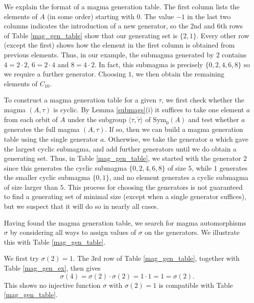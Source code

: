 \documentclass[letterpaper,12pt]{amsart}
\numberwithin{equation}{section}
\numberwithin{algorithm}{section}
\theoremstyle{definition}
\newcommand{\Symo}{\mathrm{Sym}_0}
\newcommand{\ttau}{\tilde{\tau}}
\begin{document}
We explain the format of a magma generation table. The first column lists the elements of $A$ (in some order) starting with $0$. The value $-1$ in the last two columns indicates the introduction of a new generator, so the 2nd and 6th rows of Table \ref{mag_gen_table} show that our generating set is $\{2,1\}$. Every other row (except the first) shows how the element in the first column is obtained from previous elements. Thus, in our example, the submagma generated by $2$ contains $4=2 \cdot 2$, $6=2 \cdot 4$ and $8=4 \cdot 2$. In fact, this submagma is precisely $\{0,2,4,6,8\}$ so we require a further generator. Choosing $1$, we then obtain the remaining elements of $C_{10}$. 

To construct a magma generation table for a given $\tau$, we first check whether the magma $(A,\tau)$ is cyclic. By Lemma \ref{submags}(i) it suffices to take one element $a$ from each orbit of $A$ under the subgroup $\langle \tau, \ttau \rangle$ of $\Symo(A)$ and test whether $a$ generates the full magma $(A,\tau)$. If so, then we can build a magma generation table using the single generator $a$. Otherwise, we take the generator $a$ which gave the largest cyclic submagma, and add further generators until we do obtain a generating set. Thus, in Table \ref{mag_gen_table}, we started with the generator $2$ since this generates the cyclic submagma $\{0,2,4,6,8\}$ of size $5$, while $1$ generates the smaller cyclic submagma $\{0,1\}$, and no element generates a cyclic submagma of size larger than $5$. This process for choosing the generators is not guaranteed to find a generating set of minimal size (except when a single generator suffices), but we suspect that it will do so in nearly all cases.

Having found the magma generation table, we search for magma automorphisms $\sigma$ by considering all ways to assign values of $\sigma$ on the generators. We illustrate this with Table \ref{mag_gen_table}. 

We first try
 $\sigma(2)=1$. The 3rd row of Table \ref{mag_gen_table}, together with Table \ref{mag_gen_ex}, then gives 
 $$ \sigma(4) = \sigma(2) \cdot \sigma(2) = 1 \cdot 1 =  1 = \sigma(2). $$
 This shows no injective function $\sigma$ with $\sigma(2)=1$ is compatible with Table \ref{mag_gen_table}. 
 
\end{document}
